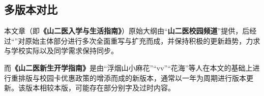 \subsection[多版本对比]{多版本对比}
本文章（即\textbf{《山二医入学与生活指南》}）原始大纲由“\textbf{山二医校园频道}”提供，后经过“\textbf{}”对原始主体部分进行多次全面重写与扩充而成，并保持积极的更新趋势，力求与学校实际以及同学需求保持同步。

而\textbf{《山二医新生开学指南》}是由“浮烟山小麻花”“vv”“花海”等人在本文的基础上进行重排版与校园卡优惠政策的增添而成的新版本，通常以一年为周期进行版本更新。该版本相较本版，可能存在部分别字及过时内容。

\textbf{}
